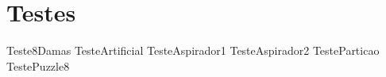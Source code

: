 \chapter{Testes}
\hypertarget{testes}{}\label{testes}
Teste8\+Damas Teste\+Artificial Teste\+Aspirador1 Teste\+Aspirador2 Teste\+Particao Teste\+Puzzle8 